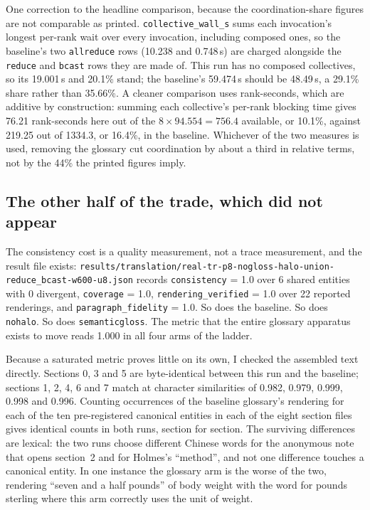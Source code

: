\documentclass[11pt]{article}
\begin{document}
One correction to the headline comparison, because the coordination-share figures are not
comparable as printed. \texttt{collective\_wall\_s} sums each invocation's longest per-rank wait
over every invocation, including composed ones, so the baseline's two \texttt{allreduce} rows
(10.238 and 0.748\,s) are charged alongside the \texttt{reduce} and \texttt{bcast} rows they are
made of. This run has no composed collectives, so its 19.001\,s and 20.1\% stand; the baseline's
59.474\,s should be 48.49\,s, a 29.1\% share rather than 35.66\%. A cleaner comparison uses
rank-seconds, which are additive by construction: summing each collective's per-rank blocking time
gives 76.21 rank-seconds here out of the $8 \times 94.554 = 756.4$ available, or 10.1\%, against
219.25 out of 1334.3, or 16.4\%, in the baseline. Whichever of the two measures is used, removing
the glossary cut coordination by about a third in relative terms, not by the 44\% the printed
figures imply.

\subsection*{The other half of the trade, which did not appear}

The consistency cost is a quality measurement, not a trace measurement, and the result file exists:
\texttt{results/translation/real-tr-p8-nogloss-halo-union-reduce\_bcast-w600-u8.json} records
\texttt{consistency} = 1.0 over 6 shared entities with 0 divergent,
\texttt{coverage} = 1.0, \texttt{rendering\_verified} = 1.0 over 22 reported
renderings, and \texttt{paragraph\_fidelity} = 1.0. So does the baseline. So does \texttt{nohalo}.
So does \texttt{semanticgloss}. The metric that the entire glossary apparatus exists to move reads
1.000
in all four arms of the ladder.

Because a saturated metric proves little on its own, I checked the assembled text directly.
Sections 0, 3 and 5 are byte-identical between this run and the baseline; sections 1, 2, 4, 6 and
7 match at character similarities of 0.982, 0.979, 0.999, 0.998 and 0.996. Counting occurrences of
the baseline glossary's rendering for each of the ten pre-registered canonical entities in each of
the eight section files gives identical counts in both runs, section for section. The surviving
differences are lexical: the two runs choose different Chinese words for the anonymous note that
opens section~2 and for Holmes's ``method'', and not one difference touches a canonical entity.
In one instance the glossary arm is the worse of the two, rendering ``seven and a half pounds'' of
body weight with the word for pounds sterling where this arm correctly uses the unit of weight.
\end{document}
